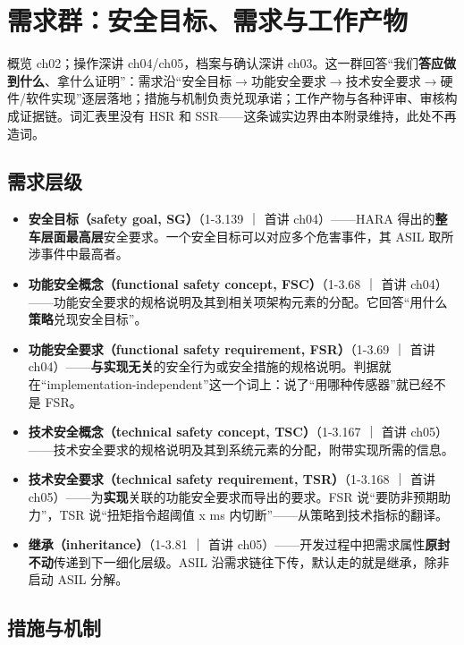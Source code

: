 \section{需求群：安全目标、需求与工作产物}

\begin{noteblock}
概览 ch02；操作深讲 ch04/ch05，档案与确认深讲 ch03。这一群回答“我们\textbf{答应做到什么}、拿什么证明”：需求沿“安全目标\(\rightarrow\)功能安全要求\(\rightarrow\)技术安全要求\(\rightarrow\)硬件/软件实现”逐层落地；措施与机制负责兑现承诺；工作产物与各种评审、审核构成证据链。词汇表里没有 HSR 和 SSR——这条诚实边界由本附录维持，此处不再造词。
\end{noteblock}

\subsection{需求层级}

\begin{itemize}
\item \textbf{安全目标（safety goal, SG）}（1-3.139 ｜ 首讲 ch04）——HARA 得出的\textbf{整车层面最高层}安全要求。一个安全目标可以对应多个危害事件，其 ASIL 取所涉事件中最高者。
\item \textbf{功能安全概念（functional safety concept, FSC）}（1-3.68 ｜ 首讲 ch04）——功能安全要求的规格说明及其到相关项架构元素的分配。它回答“用什么\textbf{策略}兑现安全目标”。
\item \textbf{功能安全要求（functional safety requirement, FSR）}（1-3.69 ｜ 首讲 ch04）——\textbf{与实现无关}的安全行为或安全措施的规格说明。判据就在“implementation-independent”这一个词上：说了“用哪种传感器”就已经不是 FSR。
\item \textbf{技术安全概念（technical safety concept, TSC）}（1-3.167 ｜ 首讲 ch05）——技术安全要求的规格说明及其到系统元素的分配，附带实现所需的信息。
\item \textbf{技术安全要求（technical safety requirement, TSR）}（1-3.168 ｜ 首讲 ch05）——为\textbf{实现}关联的功能安全要求而导出的要求。FSR 说“要防非预期助力”，TSR 说“扭矩指令超阈值 x ms 内切断”——从策略到技术指标的翻译。
\item \textbf{继承（inheritance）}（1-3.81 ｜ 首讲 ch05）——开发过程中把需求属性\textbf{原封不动}传递到下一细化层级。ASIL 沿需求链往下传，默认走的就是继承，除非启动 ASIL 分解。
\end{itemize}

\subsection{措施与机制}

